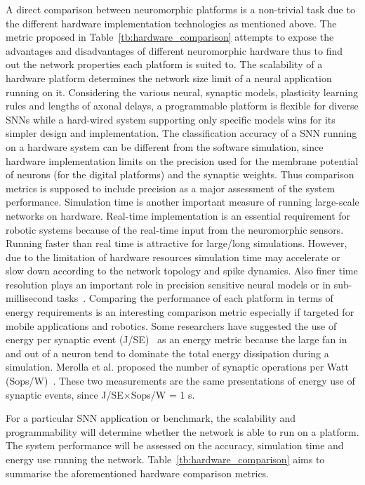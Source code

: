 A direct comparison between neuromorphic platforms is a non-trivial task due to the different hardware implementation technologies as mentioned above.
The metric proposed in Table~\ref{tb:hardware_comparison} attempts to expose the advantages and disadvantages of different neuromorphic hardware thus to find out the network properties each platform is suited to.
The scalability of a hardware platform determines the network size limit of a neural application running on it.
Considering the various neural, synaptic models, plasticity learning rules and lengths of axonal delays, a programmable platform is flexible for diverse SNNs while a hard-wired system supporting only specific models wins for its simpler design and implementation.
The classification accuracy of a SNN running on a hardware system can be different from the software simulation, since hardware implementation limits on the precision used for the membrane potential of neurons (for the digital platforms) and the synaptic weights.
Thus comparison metrics is supposed to include precision as a major assessment of the system performance.
Simulation time is another important measure of running large-scale networks on hardware.
Real-time implementation is an essential requirement for robotic systems because of the real-time input from the neuromorphic sensors.
Running faster than real time is attractive for large/long simulations.
However, due to the limitation of hardware resources simulation time may accelerate or slow down according to the network topology and spike dynamics.
Also finer time resolution plays an important role in precision sensitive neural models or in sub-millisecond tasks~\citep{lagorce2015breaking}.
Comparing the performance of each platform in terms of energy requirements is an interesting comparison metric especially if targeted for mobile applications and robotics. Some researchers have suggested the use of energy per synaptic event (J/SE)~\citep{sharp2012power,stromatias2013power} as an energy metric because the large fan in and out of a neuron tend to dominate the total energy dissipation during a simulation. Merolla et al. proposed the number of synaptic operations per Watt (Sops/W)~\citep{merolla2014million}.
These two measurements are the same presentations of energy use of synaptic events, since J/SE$\times$Sops/W = 1 s. 

For a particular SNN application or benchmark, the scalability and programmability will determine whether the network is able to run on a platform.
The system performance will be assessed on the accuracy, simulation time and energy use running the network. 
Table~\ref{tb:hardware_comparison} aims to summarise the aforementioned hardware comparison metrics.
 
